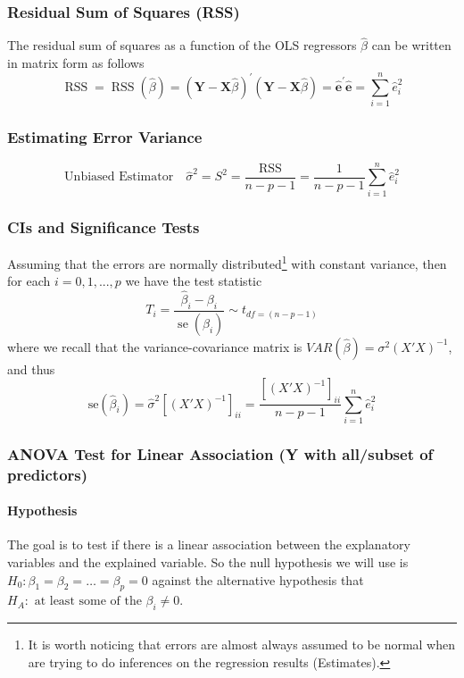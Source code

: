 \documentclass[11pt]{article}
\begin{document}
\subsubsection{Residual Sum of Squares (RSS)}
The residual sum of squares as a function of the OLS regressors $\hat{\beta}$ can be written in matrix form as follows
\begin{equation*}
    \operatorname{RSS}=\operatorname{RSS}(\hat{\beta})=(\mathbf{Y}-\mathbf{X} \hat{\beta})^{\prime}(\mathbf{Y}-\mathbf{X} \hat{\beta})=\hat{\mathbf{e}}^{\prime } \hat{\mathbf{e}}=\sum_{i=1}^{n} \hat{e}_{i}^{2}
\end{equation*}

\subsubsection{Estimating Error Variance}
\begin{equation*}
    \text{Unbiased Estimator}\quad \hat{\sigma}^2 = S^2 = \frac{\mathrm{RSS}}{n-p-1}=\frac{1}{n-p-1} \sum_{i=1}^{n} \hat{e}_{i}^{2}
\end{equation*}


\subsubsection{CIs and Significance Tests}
Assuming that the errors are normally distributed\footnote{It is worth noticing that errors are almost always assumed to be normal when are trying to do inferences on the regression results (Estimates).} with constant variance, then for each $i = 0,1,...,p$ we have the test statistic
\begin{equation*}
    T_{i}=\frac{\hat{\beta}_{i}-\beta_{i}}{\operatorname{se}(\hat{\beta_i})} \sim t_{df = (n-p-1)}
\end{equation*}
where we recall that the variance-covariance matrix is $VAR(\hat{\beta}) = \sigma^2 (X'X)^{-1}$, and thus
\begin{equation*}
    \mathrm{se}(\hat{\beta}_i) = \hat{\sigma}^2 \left[(X'X)^{-1}\right]_{ii} =  \frac{\left[(X'X)^{-1}\right]_{ii}}{n-p-1} \sum_{i=1}^{n} \hat{e}_{i}^{2}
\end{equation*}


\subsubsection{ANOVA Test for Linear Association (Y with all/subset of predictors)}
\paragraph{Hypothesis} The goal is to test if there is a linear association between the explanatory variables and the explained variable. So the null hypothesis we will use is $H_{0}: \beta_{1}=\beta_{2}=\ldots=\beta_{p}=0$ against the alternative hypothesis that $H_{A}: \text { at least some of the } \beta_{i} \neq 0$. 
\end{document}
